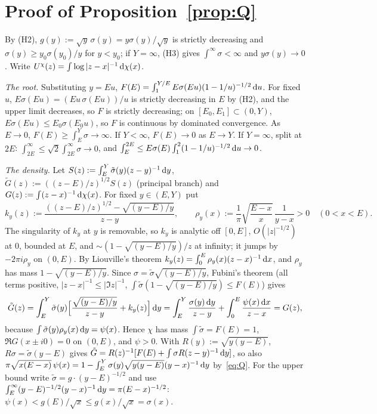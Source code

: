 \section{Proof of Proposition~\ref{prop:Q}}\label{app:Q}

By (H2), $g(y):=\sqrt y\,\sigma(y)=y\sigma(y)/\sqrt y$ is strictly decreasing and $\sigma(y)\ge y_0\sigma(y_0)/y$ for $y<y_0$; if $Y=\infty$, (H3)
gives $\int^\infty\sigma<\infty$ and $y\sigma(y)\to0$. Write $U^\chi(z)=\int\log|z-x|^{-1}\,\mathrm{d}\chi(x)$.

\emph{The root.} Substituting $y=Eu$, $F(E)=\int_1^{Y/E}E\sigma(Eu)(1-1/u)^{-1/2}\,\mathrm{d} u$. For fixed $u$, $E\sigma(Eu)=(Eu\,\sigma(Eu))/u$ is strictly
decreasing in $E$ by (H2), and the upper limit decreases, so $F$ is strictly decreasing; on $[E_0,E_1]\subset(0,Y)$, $E\sigma(Eu)\le E_0\sigma(E_0u)$, so
$F$ is continuous by dominated convergence. As $E\to0$, $F(E)\ge\int_E^Y\sigma\to\infty$. If $Y<\infty$, $F(E)\to0$ as $E\to Y$. If $Y=\infty$, split
at $2E$: $\int_{2E}^\infty\le\sqrt2\int_{2E}^\infty\sigma\to0$, and $\int_E^{2E}\le E\sigma(E)\int_1^2(1-1/u)^{-1/2}\,\mathrm{d} u\to0$.

\emph{The density.} Let $S(z):=\int_E^Y\tilde\sigma(y)(z-y)^{-1}\,\mathrm{d} y$, $\tilde G(z):=((z-E)/z)^{1/2}S(z)$ (principal branch) and $G(z):=\int(z-x)^{-1}\,\mathrm{d}\chi(x)$.
For fixed $y\in(E,Y)$ put
\[
  k_y(z):=\frac{((z-E)/z)^{1/2}-\sqrt{(y-E)/y}}{z-y},\qquad \rho_y(x):=\frac1\pi\sqrt{\frac{E-x}x}\,\frac1{y-x}>0\quad(0<x<E).
\]
The singularity of $k_y$ at $y$ is removable, so $k_y$ is analytic off $[0,E]$, $O(|z|^{-1/2})$ at $0$, bounded at $E$, and
$\sim(1-\sqrt{(y-E)/y})/z$ at infinity; it jumps by $-2\pi i\rho_y$ on $(0,E)$. By Liouville's theorem $k_y(z)=\int_0^E\rho_y(x)(z-x)^{-1}\,\mathrm{d} x$,
and $\rho_y$ has mass $1-\sqrt{(y-E)/y}$. Since $\sigma=\tilde\sigma\sqrt{(y-E)/y}$, Fubini's theorem (all terms positive, $|z-x|^{-1}\le|\Im z|^{-1}$,
$\int \tilde\sigma(1-\sqrt{(y-E)/y})\le F(E)$) gives
\[
  \tilde G(z)=\int_E^Y\tilde\sigma(y)\Bigl[\frac{\sqrt{(y-E)/y}}{z-y}+k_y(z)\Bigr]\,\mathrm{d} y=\int_E^Y\frac{\sigma(y)\,\mathrm{d} y}{z-y}+\int_0^E\frac{\psi(x)\,\mathrm{d} x}{z-x}=G(z),
\]
because $\int \tilde\sigma(y)\rho_y(x)\,\mathrm{d} y=\psi(x)$. Hence $\chi$ has mass $\int \tilde\sigma=F(E)=1$, $\Re G(x\pm i0)=0$ on $(0,E)$, and $\psi>0$. With $R(y):=\sqrt{y(y-E)}$,
$R\sigma=\tilde\sigma(y-E)$ gives $\tilde G=R(z)^{-1}[F(E)+\int\sigma R(z-y)^{-1}\,\mathrm{d} y]$, so also
$\pi\sqrt{x(E-x)}\,\psi(x)=1-\int_E^Y\sigma(y)\sqrt{y(y-E)}(y-x)^{-1}\,\mathrm{d} y$ by~\eqref{eq:Q}. For the upper bound write $\tilde\sigma=g\cdot(y-E)^{-1/2}$ and use
$\int_E^\infty(y-E)^{-1/2}(y-x)^{-1}\,\mathrm{d} y=\pi(E-x)^{-1/2}$: $\psi(x)<g(E)/\sqrt x\le g(x)/\sqrt x=\sigma(x)$.

